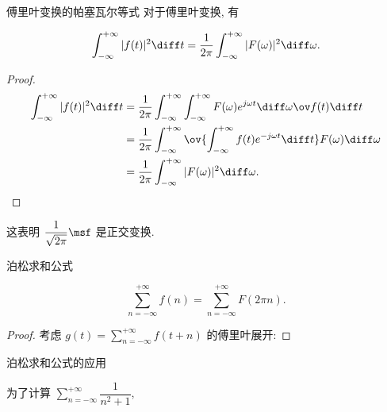 \begin{frame}{傅里叶变换的帕塞瓦尔等式\noexer}
	\beqskip{5pt}
	\onslide<+->
	对于傅里叶变换, 有
	\begin{theorem}
		\[\int_{-\infty}^{+\infty}|f(t)|^2\diff t
		=\frac1{2\pi}\int_{-\infty}^{+\infty}|F(\omega)|^2\diff \omega.\]
	\end{theorem}
	\onslide<+->
	\begin{proof}
		\begin{align*}
			\int_{-\infty}^{+\infty}|f(t)|^2\diff t
			&=\dfrac1{2\pi}\int_{-\infty}^{+\infty}\int_{-\infty}^{+\infty}F(\omega)e^{j\omega t}\diff \omega \ov f(t)\diff t\\
			&=\dfrac1{2\pi}\int_{-\infty}^{+\infty}\ov{\int_{-\infty}^{+\infty}f(t)e^{-j\omega t}\diff t}F(\omega)\diff \omega\\
			&=\frac1{2\pi}\int_{-\infty}^{+\infty}|F(\omega)|^2\diff \omega.\qedhere
		\end{align*}
	\end{proof}
	\onslide<+->
	这表明 $\dfrac1{\sqrt{2\pi}}\msf$ 是正交变换.
	\endgroup
\end{frame}


\begin{frame}{泊松求和公式\noexer}
	\beqskip{0pt}
	\onslide<+->
	\begin{theorem}
		\[\sum_{n=-\infty}^{+\infty}f(n)
		=\sum_{n=-\infty}^{+\infty}F(2\pi n).\]
	\end{theorem}
	\onslide<+->
	\begin{proof}
		考虑 $g(t)=\sum\limits_{n=-\infty}^{+\infty}f(t+n)$ 的傅里叶展开:
		\onslide<+->{%
		令 $t=0$ 即得.\qedhere
		}
	\end{proof}
	\endgroup
\end{frame}


\begin{frame}{泊松求和公式的应用\noexer}
	\onslide<+->
	\begin{example}
		为了计算 $\sum\limits_{n=-\infty}^{+\infty}\dfrac1{n^2+1}$, 
		\onslide<+->{%
		\[f(t)=\msf^{-1}[F(\omega)]=e^{-2\pi t\sgn(t)}.\]
		}\onslide<+->{%
		于是
		\[
			\sum_{n=-\infty}^{+\infty}\frac1{n^2+1}
			=\pi\sum_{n=-\infty}^{+\infty}F(2\pi n)
			\onslide<+->{=\pi\sum_{n=-\infty}^{+\infty}f(n)
			=\pi\Bigl(1+2\sum_{n=1}^\infty e^{-2\pi n}\Bigr)
			=\frac{\pi}{\tanh\pi}.}
		\]
		}
	\end{example}
\end{frame}


